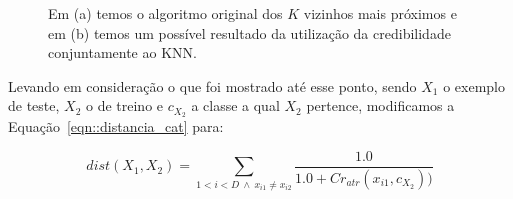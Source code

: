 \begin{figure}[ht]
\centering
{}
\caption{Em (a) temos o algoritmo original dos $K$ vizinhos mais próximos e em (b) temos um possível resultado da utilização da credibilidade conjuntamente ao \textsc{KNN}.  
\label{fig::KNNantesedepois}}
\end{figure}

Levando em consideração o que foi mostrado até esse ponto, sendo $X_1$ o exemplo de teste, $X_2$ o de treino e $c_{X_2}$ a classe a qual $X_2$ pertence, modificamos a Equação~\ref{eqn::distancia_cat} para:

\begin{equation} \label{eqn::distancia_cat_cred}
   dist(X_1, X_2) = \sum_{1 < i < D\ \wedge \ x_{i1} \neq x_{i2}} \frac{1.0}{1.0 + Cr_{atr}(x_{i1}, c_{X_2} ))}
\end{equation}

